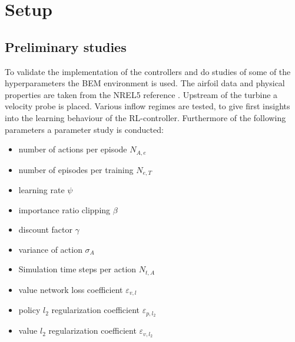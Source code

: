 \section{Setup}
\subsection{Preliminary studies}
To validate the implementation of the controllers and do studies of some of the hyperparameters the BEM environment is used. The airfoil data and physical properties are taken from the NREL5 reference \cite{jonkman_definition_2009}. Upstream of the turbine a velocity probe is placed. Various inflow regimes are tested, to give first insights into the learning behaviour of the RL-controller. Furthermore of the following parameters a parameter study is conducted:
\begin{itemize}
	\item number of actions per episode $N_{A,e}$
	\item number of episodes per training $N_{e,T}$
	\item learning rate $\psi$
	\item importance ratio clipping $\beta$
	\item discount factor $\gamma$
	\item variance of action $\sigma_A$
	\item Simulation time steps per action $N_{t,A}$
	\item value network loss coefficient $\varepsilon_{v,l}$
	\item policy $l_2$ regularization coefficient $\varepsilon_{p,l_2}$
	\item value $l_2$ regularization coefficient $\varepsilon_{v,l_2}$
\end{itemize}